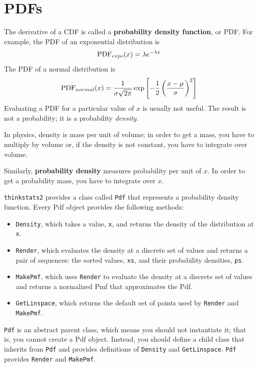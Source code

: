 \documentclass[12pt]{book}
\begin{document}
\section{PDFs}

The derivative of a CDF is called a {\bf probability density function},
or PDF.  For example, the PDF of an exponential distribution is
%
\[ \mathrm{PDF}_{expo}(x) = \lambda e^{-\lambda x}   \]
%
The PDF of a normal distribution is
%
\[ \mathrm{PDF}_{normal}(x) = \frac{1}{\sigma \sqrt{2 \pi}} 
                 \exp \left[ -\frac{1}{2} 
                 \left( \frac{x - \mu}{\sigma} \right)^2 \right]  \]
%
Evaluating a PDF for a particular value of $x$ is usually not useful.
The result is not a probability; it is a probability {\em density}.

In physics, density is mass per unit of
volume; in order to get a mass, you have to multiply by volume or,
if the density is not constant, you have to integrate over volume.

Similarly, {\bf probability density} measures probability per unit of $x$.
In order to get a probability mass, you have to integrate over $x$.

{\tt thinkstats2} provides a class called {\tt Pdf} that represents
a probability density function.  Every Pdf object provides the
following methods:

\begin{itemize}

\item {\tt Density}, which takes a value, {\tt x}, and returns the
  density of the distribution at {\tt x}.

\item {\tt Render}, which evaluates the density at a discrete set of
  values and returns a pair of sequences: the sorted values, {\tt xs},
  and their probability densities, {\tt ps}.

\item {\tt MakePmf}, which uses {\tt Render} to evaluate the density
  at a discrete set of values and returns a normalized Pmf that
  approximates the Pdf.

\item {\tt GetLinspace}, which returns the default set of points used 
  by {\tt Render} and {\tt MakePmf}.

\end{itemize}  

{\tt Pdf} is an abstract parent class, which means you should not
instantiate it; that is, you cannot create a Pdf object.  Instead, you
should define a child class that inherits from {\tt Pdf} and provides
definitions of {\tt Density} and {\tt GetLinspace}.  {\tt Pdf} provides
{\tt Render} and {\tt MakePmf}.
\end{document}
